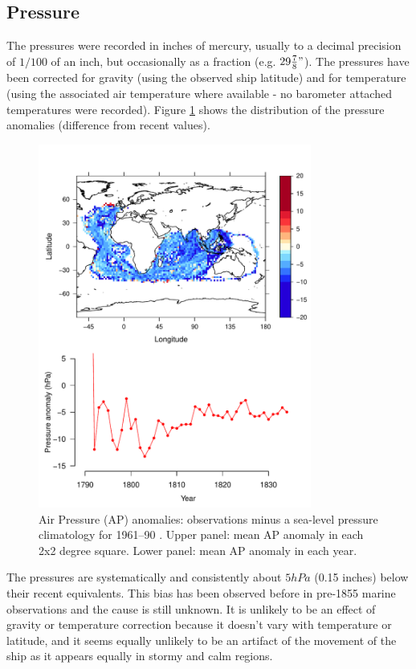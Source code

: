 \documentclass[CP]{copernicus}
\begin{document}
\subsection{Pressure}

The pressures were recorded in inches of mercury, usually to a decimal precision of $1/100$ of an inch, but occasionally as a fraction (e.g. $29 {7\over8}"$). The pressures have been corrected for gravity (using the observed ship latitude) and for temperature (using the associated air temperature where available - no barometer attached temperatures were recorded). Figure \ref{pwat2} shows the distribution of the pressure anomalies (difference from recent values).
\begin{figure}[!hbp]
\begin{center}
\includegraphics[angle=0, width=0.8\textwidth]{../figures/pressures}
\caption{Air Pressure (AP) anomalies: observations minus a sea-level pressure climatology for 1961--90 \citep{allan06meansealevelpressure}. Upper panel: mean AP anomaly in each 2x2 degree square. Lower panel: mean AP anomaly in each year.}
\label{pwat2}
\end{center}
\end{figure}
The pressures are systematically and consistently about $5hPa$ (0.15 inches) below their recent equivalents. This bias has been observed before in pre-1855 marine observations \citep{ansell06emulate,brohan10corral} and the cause is still unknown. It is unlikely to be an effect of gravity or temperature correction because it doesn't vary with temperature or latitude, and it seems equally unlikely to be an artifact of the movement of the ship as it appears equally in stormy and calm regions.
\end{document}
